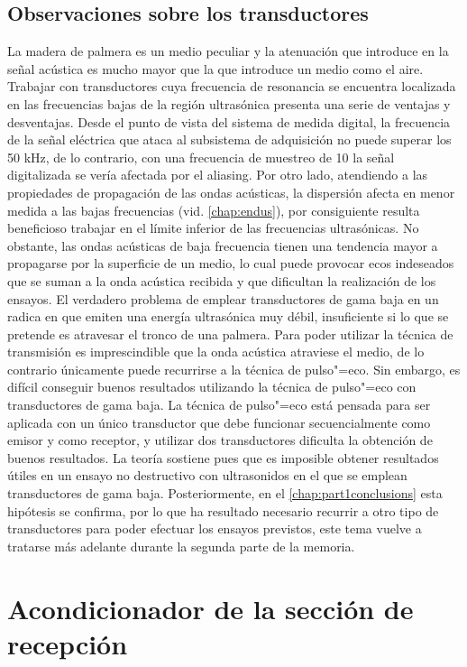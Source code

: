 \subsection{Observaciones sobre los transductores}

La madera de palmera es un medio peculiar y la atenuación que introduce en
la señal acústica es mucho mayor que la que introduce un medio como el
aire. Trabajar con transductores cuya frecuencia de resonancia se encuentra
localizada en las frecuencias bajas de la región ultrasónica presenta una
serie de ventajas y desventajas. Desde el punto de vista del sistema de
medida digital, la frecuencia de la señal eléctrica que ataca al subsistema
de adquisición no puede superar los 50 kHz, de lo contrario, con una
frecuencia de muestreo de 10 \kms{} la señal digitalizada se vería afectada
por el aliasing. Por otro lado, atendiendo a las propiedades de propagación
de las ondas acústicas, la dispersión afecta en menor medida a las bajas
frecuencias (vid. \cref{chap:endus}), por consiguiente resulta beneficioso
trabajar en el límite inferior de las frecuencias ultrasónicas. No
obstante, las ondas acústicas de baja frecuencia tienen una tendencia mayor
a propagarse por la superficie de un medio, lo cual puede provocar ecos
indeseados que se suman a la onda acústica recibida y que dificultan la
realización de los ensayos. El verdadero problema de emplear transductores
de gama baja en un  radica en que emiten una energía ultrasónica
muy débil, insuficiente si lo que se pretende es atravesar el tronco de una
palmera. Para poder utilizar la técnica de transmisión es imprescindible
que la onda acústica atraviese el medio, de lo contrario únicamente puede
recurrirse a la técnica de pulso"=eco. Sin embargo, es difícil conseguir
buenos resultados utilizando la técnica de pulso"=eco con transductores de
gama baja. La técnica de pulso"=eco está pensada para ser aplicada con un
único transductor que debe funcionar secuencialmente como emisor y como
receptor, y utilizar dos transductores dificulta la obtención de buenos
resultados. La teoría sostiene pues que es imposible obtener resultados
útiles en un ensayo no destructivo con ultrasonidos en el que se emplean
transductores de gama baja. Posteriormente, en el
\cref{chap:part1conclusions} esta hipótesis se confirma, por lo que ha
resultado necesario recurrir a otro tipo de transductores para poder
efectuar los ensayos previstos, este tema vuelve a tratarse más adelante
durante la segunda parte de la memoria.


\section{Acondicionador de la sección de recepción}\label{sec:rxco}

